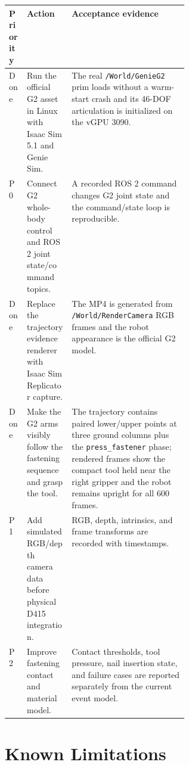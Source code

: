 \documentclass[11pt,a4paper]{article}
\begin{document}
\begin{tabularx}{\linewidth}{@{}p{0.10\linewidth}p{0.25\linewidth}X@{}}
\toprule
\textbf{Priority} & \textbf{Action} & \textbf{Acceptance evidence} \\
\midrule
Done & Run the official G2 asset in Linux with Isaac Sim 5.1 and Genie Sim. &
     The real \texttt{/World/GenieG2} prim loads without a warm-start crash and its
     46-DOF articulation is initialized on the vGPU 3090. \\
P0 & Connect G2 whole-body control and ROS 2 joint state/command topics. &
     A recorded ROS 2 command changes G2 joint state and the command/state loop is
     reproducible. \\
Done & Replace the trajectory evidence renderer with Isaac Sim Replicator capture. &
     The MP4 is generated from \texttt{/World/RenderCamera} RGB frames and the
     robot appearance is the official G2 model. \\
Done & Make the G2 arms visibly follow the fastening sequence and grasp the tool. &
     The trajectory contains paired lower/upper points at three ground columns plus
     the \texttt{press\_fastener} phase; rendered frames show the compact tool held
     near the right gripper and the robot remains upright for all 600 frames. \\
P1 & Add simulated RGB/depth camera data before physical D415 integration. &
     RGB, depth, intrinsics, and frame transforms are recorded with timestamps. \\
P2 & Improve fastening contact and material model. &
     Contact thresholds, tool pressure, nail insertion state, and failure cases are
     reported separately from the current event model. \\
\bottomrule
\end{tabularx}

\section{Known Limitations}
\end{document}
